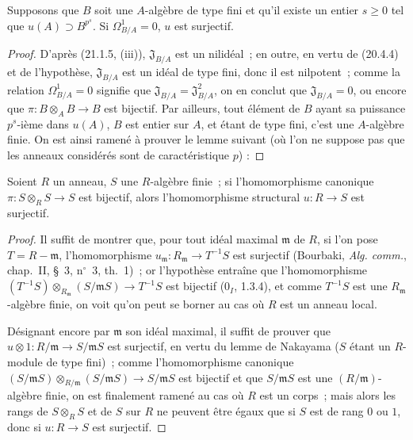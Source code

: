 \begin{corollary}[21.1.6]
\label{0.21.1.6-fr}
Supposons que $B$ soit une $A$-algèbre de type fini et qu'il existe un
entier $s\geq0$ tel que $u(A)\supset B^{p^s}$. Si $\Omega^1_{B/A}=0$,
$u$ est surjectif.
\end{corollary}

\begin{proof}
D'après (21.1.5, (iii)), $\mathfrak J_{B/A}$ est un nilidéal~; en outre,
en vertu de (20.4.4) et de l'hypothèse, $\mathfrak J_{B/A}$ est un idéal de
type fini, donc il est nilpotent~; comme la relation $\Omega^1_{B/A}=0$
signifie que $\mathfrak J_{B/A}=\mathfrak J_{B/A}^2$, on en conclut que
$\mathfrak J_{B/A}=0$, ou encore que $\pi:B\otimes_A B\to B$ est bijectif.
Par ailleurs, tout élément de $B$ ayant sa puissance $p^s$-ième dans $u(A)$,
$B$ est entier sur $A$, et étant de type fini, c'est une $A$-algèbre finie.
On est ainsi ramené à prouver le lemme suivant (où l'on ne suppose pas que
les anneaux considérés sont de caractéristique $p$) :
\end{proof}

\begin{lemma}[21.1.6.1]
\label{0.21.1.6.1-fr}
Soient $R$ un anneau, $S$ une $R$-algèbre finie~; si l'homomorphisme
canonique $\pi:S\otimes_R S\to S$ est bijectif, alors l'homomorphisme
structural $u:R\to S$ est surjectif.
\end{lemma}

\begin{proof}
Il suffit de montrer que, pour tout idéal maximal $\mathfrak m$ de $R$, si
l'on pose $T=R-\mathfrak m$, l'homomorphisme
$u_{\mathfrak m}:R_{\mathfrak m}\to T^{-1}S$ est surjectif (Bourbaki,
\emph{Alg. comm.}, chap.~II, §~3, n$^\circ$~3, th.~1)~; or l'hypothèse
entraîne que l'homomorphisme
$(T^{-1}S)\otimes_{R_{\mathfrak m}}(S/\mathfrak mS)\to T^{-1}S$
est bijectif (0$_I$, 1.3.4), et comme $T^{-1}S$ est une
$R_{\mathfrak m}$-algèbre finie, on voit qu'on peut se borner au cas où
$R$ est un anneau local.

Désignant encore par $\mathfrak m$ son idéal maximal, il suffit de prouver que
$u\otimes1:R/\mathfrak m\to S/\mathfrak mS$ est surjectif, en vertu du
lemme de Nakayama ($S$ étant un $R$-module de type fini)~; comme
l'homomorphisme canonique
$(S/\mathfrak mS)\otimes_{R/\mathfrak m}(S/\mathfrak mS)\to S/\mathfrak mS$
est bijectif et que $S/\mathfrak mS$ est une $(R/\mathfrak m)$-algèbre finie,
on est finalement ramené au cas où $R$ est un corps~; mais alors les rangs de
$S\otimes_R S$ et de $S$ sur $R$ ne peuvent être égaux que si $S$ est de rang
$0$ ou $1$, donc si $u:R\to S$ est surjectif.
\end{proof}


